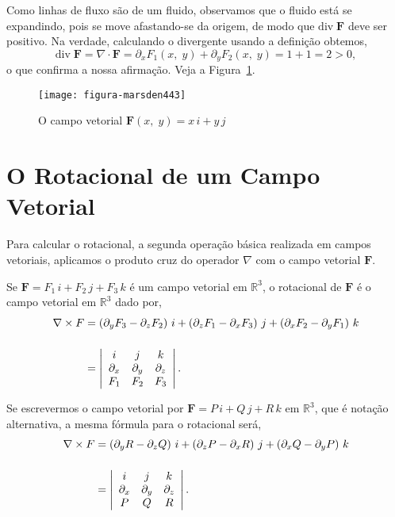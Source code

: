 \solo
Como linhas de fluxo são de um fluido, observamos que o fluido está se expandindo, pois se move afastando-se da origem, de modo que
\(\mathrm{div}\; \mathbf{F}\) deve ser positivo. Na verdade, calculando o divergente usando a definição obtemos,
\begin{equation*}
	\mathrm{div}\; \mathbf{F} =\nabla \cdot \mathbf{F}= \partial_{x}F_{1}(x,\; y)+\partial_{y}F_{2}(x,\; y)=1+1=2>0,
\end{equation*}
o que confirma a nossa afirmação. Veja a Figura~\ref{fig:4-4-3}.

\begin{figure}[H]
	\centering
	\texttt{[image: figura-marsden443]}
	\caption{O campo vetorial \(\mathbf{F}(x,\; y) = x\, i + y\, j\)}
	\label{fig:4-4-3}
\end{figure}

%
\section{O Rotacional de um Campo Vetorial}
%
Para calcular o rotacional, a segunda operação básica realizada em campos vetoriais, aplicamos o produto cruz do operador \(\nabla\) com o campo vetorial \(\mathbf{F}\).

\begin{defi}[Rotacional]
	Se \(\mathbf{F} = F_{1}\, i + F_{2}\, j + F_{3}\, k\) é um campo vetorial em $\mathbb{R}^{3}$,  o rotacional de \(\mathbf{F}\) é o campo vetorial em $\mathbb{R}^{3}$ dado por,
	\begin{align*}
		\nabla\times F &= \left(\partial_{y}F_{3}-\partial_{z}F_{2}\right)\,i +\left(\partial_{z}F_{1}-\partial_{x}F_{3}\right)\, j
		+\left(\partial_{x}F_{2}-\partial_{y}F_{1} \right)\, k \\[3ex]
		&=\left|\begin{array}[c]{ccc}
			i& j & k\\
			\partial_{x} & \partial_{y} & \partial_{z}\\
			F_{1} & F_{2} & F_{3}		
		\end{array}
		\right|.
	\end{align*}
\end{defi}

Se escrevermos o campo vetorial por \(\mathbf{F} = P\,i + Q\,j + R\,k\) em $\mathbb{R}^{3}$, que é notação alternativa, a mesma fórmula para o rotacional será,
\begin{align*}
	\nabla\times F &= \left(\partial_{y}R-\partial_{z}Q\right)\,i +\left(\partial_{z}P-\partial_{x}R\right)\, j
	+\left(\partial_{x}Q-\partial_{y}P \right)\, k \\[3ex]
	&=\left|\begin{array}[c]{ccc}
		i& j & k\\
		\partial_{x} & \partial_{y} & \partial_{z}\\
		P & Q & R		
	\end{array}
	\right|.	
\end{align*}

